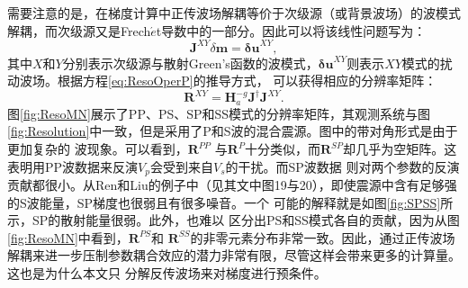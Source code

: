 需要注意的是，在梯度计算中正传波场解耦等价于次级源（或背景波场）的波模式解耦，而次级源又是Frech{$\acute{e}$}t导数中的一部分。因此可以将该线性问题写为：
\begin{equation}
    \mathbf{J}^{XY}\delta\mathbf{m}=\mathbf{\delta u}^{XY},
    \label{eq:JXY}
\end{equation}
其中$X$和$Y$分别表示次级源与散射Green's函数的波模式，$\mathbf{\delta u}^{XY}$则表示${X}{Y}$模式的扰动波场。根据方程\eqref{eq:ResoOperP}的推导方式，
可以获得相应的分辨率矩阵：
\begin{equation}
    \mathbf{R}^{XY}=\mathbf{H}_a^{-g}\mathbf{J}^{\dagger}\mathbf{J}^{XY}. 
    \label{eq:RXY}  
\end{equation}
图\ref{fig:ResoMN}展示了PP、PS、SP和SS模式的分辨率矩阵，其观测系统与图\ref{fig:Resolution}中一致，但是采用了P和S波的混合震源。图中的带对角形式是由于更加复杂的
波现象。可以看到，$\mathbf{R}^{PP}$ 与$\mathbf{R}^P$十分类似，而$\mathbf{R}^{SP}$却几乎为空矩阵。这表明用PP波数据来反演$V_p$会受到来自$V_s$的干扰。而SP波数据
则对两个参数的反演贡献都很小。从Ren和Liu\cite{ren.liu:2016}的例子中（见其文中图19与20），即使震源中含有足够强的S波能量，SP梯度也很弱且有很多噪音。一个
可能的解释就是如图\ref{fig:SPSS}所示，SP的散射能量很弱。此外，也难以
区分出PS和SS模式各自的贡献，因为从图\ref{fig:ResoMN}中看到，$\mathbf{R}^{PS}$和
$\mathbf{R}^{SS}$的非零元素分布非常一致。因此，通过正传波场解耦来进一步压制参数耦合效应的潜力非常有限，尽管这样会带来更多的计算量。这也是为什么本文只
分解反传波场来对梯度进行预条件。

